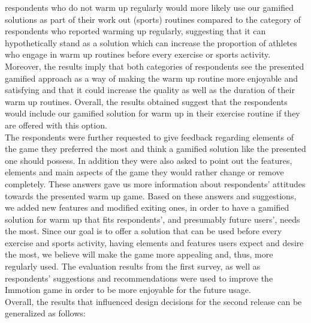 respondents who do not warm up regularly would more likely use our gamified solutions as part of their work out (sports) routines compared to the category of respondents who reported warming up regularly, suggesting that it can hypothetically stand as a solution which can increase the proportion of athletes who engage in warm up routines before every exercise or sports activity. Moreover, the results imply that both categories of respondents see the presented gamified approach as a way of making the warm up routine more enjoyable and satisfying and that it could increase the quality as well as the duration of their warm up routines. Overall, the results obtained suggest that the respondents would include our gamified solution for warm up in their exercise routine if they are offered with this option.\\The respondents were further requested to give feedback regarding elements of the game they preferred the most and think a gamified solution like the presented one should possess. In addition they were also asked to point out the features, elements and main aspects of the game they would rather change or remove completely. These answers gave us more information about respondents' attitudes towards the presented warm up game. Based on these answers and suggestions, we added new features and modified exiting ones, in order to have a gamified solution for warm up that fits respondents', and presumably future users', needs the most. Since our goal is to offer a solution that can be used before every exercise and sports activity, having elements and features users expect and desire the most, we believe will make the game more appealing and, thus, more regularly used. The evaluation results from the first survey, as well as respondents' suggestions and recommendations were used to improve the Immotion game in order to be more enjoyable for the future usage.\\ Overall, the results that influenced design decisions for the second release can be generalized as follows:
